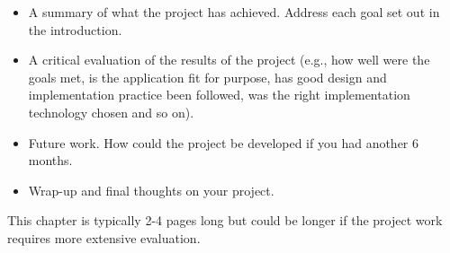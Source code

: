 \documentclass[ openright,titlepage,numbers=noenddot,headinclude,%
                footinclude=true,BCOR=5mm,paper=a4,fontsize=12pt,a4paper,english%
                ]{scrreprt}
\begin{document}
\begin{itemize}
\item A summary of what the project has achieved. Address each goal set
out in the introduction.
\item A critical evaluation of the results of the project (e.g., how well were the goals met, is the application fit for purpose, has good design and implementation practice been followed, was the right implementation technology chosen and so on).
\item Future work. How could the project be developed if you had another 6 months.
\item Wrap-up and final thoughts on your project.
\end{itemize}

This chapter is typically 2-4 pages long but could be longer if the project
work requires more extensive evaluation.



%

\end{document}
